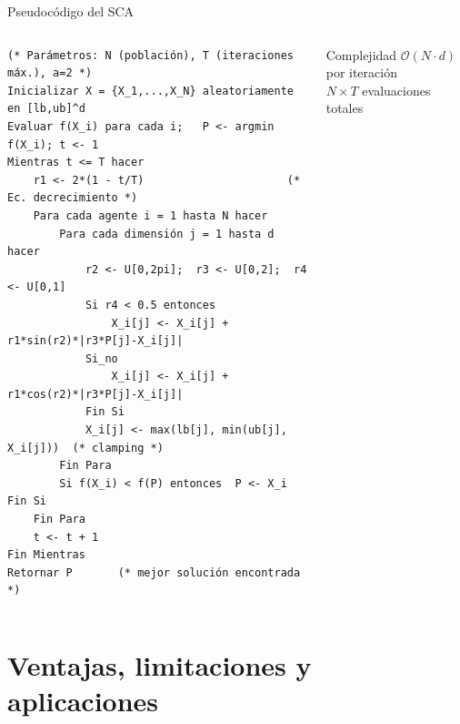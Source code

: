 \documentclass[aspectratio=169, spanish]{beamer}
\begin{document}
\begin{frame}[fragile]{Pseudocódigo del SCA}
\begin{columns}[T, onlytextwidth]
    \vspace{-0.7cm}
\begin{lstlisting}[style=aimaStyle, language=pseudo]
(* Parámetros: N (población), T (iteraciones máx.), a=2 *)
Inicializar X = {X_1,...,X_N} aleatoriamente en [lb,ub]^d
Evaluar f(X_i) para cada i;   P <- argmin f(X_i); t <- 1
Mientras t <= T hacer
    r1 <- 2*(1 - t/T)                      (* Ec. decrecimiento *)
    Para cada agente i = 1 hasta N hacer
        Para cada dimensión j = 1 hasta d hacer
            r2 <- U[0,2pi];  r3 <- U[0,2];  r4 <- U[0,1]
            Si r4 < 0.5 entonces
                X_i[j] <- X_i[j] + r1*sin(r2)*|r3*P[j]-X_i[j]|
            Si_no
                X_i[j] <- X_i[j] + r1*cos(r2)*|r3*P[j]-X_i[j]|
            Fin Si
            X_i[j] <- max(lb[j], min(ub[j], X_i[j]))  (* clamping *)
        Fin Para
        Si f(X_i) < f(P) entonces  P <- X_i  Fin Si
    Fin Para
    t <- t + 1
Fin Mientras
Retornar P       (* mejor solución encontrada *)
\end{lstlisting}
    \begin{block}{Complejidad}
        \centering
        $\mathcal{O}(N \cdot d)$ por iteración\\
        $N \times T$ evaluaciones totales
    \end{block}
  \end{columns}
\end{frame}

\section{Ventajas, limitaciones y aplicaciones}
\end{document}
